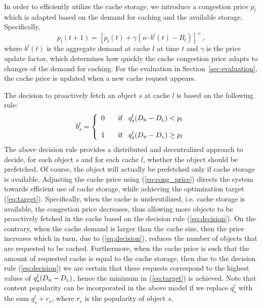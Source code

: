 \documentclass[conference]{IEEEtran}
\newcommand{\mynote}[1]{{{\medskip
\footnotesize \em \noindent Note: #1}}\medskip}
\renewcommand{\mynote}[1]{}
\newcommand{\Leaf}{\mbox{\tiny L}}
\newcommand{\R}{\mbox{\tiny R}}
\begin{document}
In order to efficiently utilize the cache storage, we introduce a congestion price $p_l$ which is adapted based on the demand for caching and the available storage.
Specifically,
\begin{equation}
p_l(t+1)= \left [ p_l(t)+ \gamma \left ( o \cdot b^l(t) - B_l \right ) \right ] ^+ \, , \label{eq:cong_price}
\end{equation}
where $b^l(t)$ is the aggregate demand at cache $l$ at time $t$ and $\gamma$ is the price update factor, which  determines how quickly the cache congestion price adapts to changes of the demand for caching.
For the evaluation in Section~\ref{sec:evaluation}, the cache price is updated when a new cache request appears.

\mynote{
The implementation uses a slightly  different cache price update. Need to decide if we need to change above.
}

The decision to proactively fetch an object $s$ at cache $l$ is based on  the following  rule:
\begin{equation}
b^l_s=
\left \{
\begin{array}{cc}
0 \; \;  & \mbox{ if } \; \; q^l_s (D_{\R}-D_{\Leaf}) < p_l  \\
$\,$ & \nonumber \\
1 \; \;  & \mbox{ if } \; \; q^l_s (D_{\R}-D_{\Leaf}) \geq p_l
\end{array}
\right .
\label{eq:decision}
\end{equation}
The above decision rule provides a distributed and decentralized approach to decide, for each object $s$ and for each cache $l$, whether the object should be prefetched.
Of course, the object will actually be prefetched only if cache storage is available.
Adjusting the cache price using (\ref{eq:cong_price}) directs the system towards efficient use of cache storage, while achieving the optimization  target (\ref{eq:target}). Specifically, when the cache is underutilized, i.e. cache storage is available,  the congestion price decreases, thus allowing more objects to be proactively fetched in the cache based on the decision rule (\ref{eq:decision}). On the contrary, when the cache demand  is larger than the cache size, then the price increases which in turn, due to (\ref{eq:decision}), reduces the number of objects that are requested to be  cached.
Furthermore, when the cache price is such that the  amount of requested cache is equal to the cache storage, then due to the decision rule (\ref{eq:decision}) we are certain that these requests correspond to the highest values of $q^l_s (D_{\R}-D_{\Leaf})$, hence the minimum in (\ref{eq:target}) is achieved.
Note that content popularity can be incorporated in the above model if we replace $q_s^l$ with the sum $q_s^l+r_s$, where $r_s$ is the popularity of object $s$.
\end{document}
